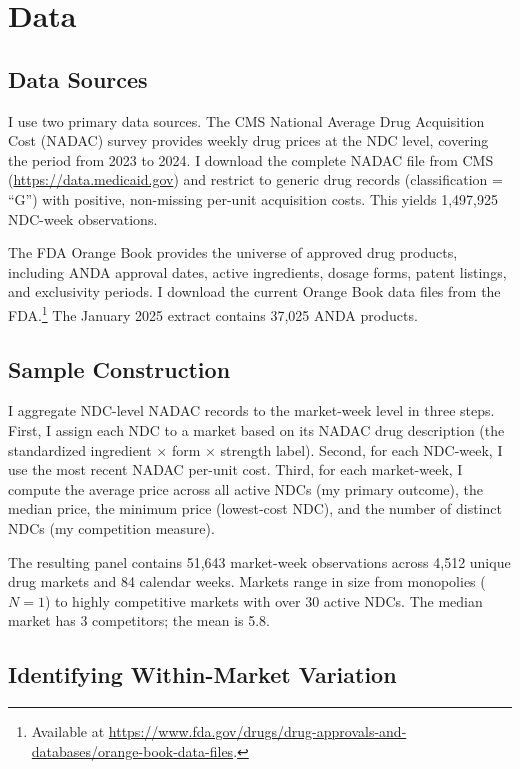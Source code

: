 \documentclass[12pt]{article}
\begin{document}
\section{Data}\label{sec:data}

\subsection{Data Sources}

I use two primary data sources. The CMS National Average Drug Acquisition Cost (NADAC) survey provides weekly drug prices at the NDC level, covering the period from 2023 to 2024. I download the complete NADAC file from CMS (\url{https://data.medicaid.gov}) and restrict to generic drug records (classification = ``G'') with positive, non-missing per-unit acquisition costs. This yields 1,497,925 NDC-week observations.

The FDA Orange Book provides the universe of approved drug products, including ANDA approval dates, active ingredients, dosage forms, patent listings, and exclusivity periods. I download the current Orange Book data files from the FDA.\footnote{Available at \url{https://www.fda.gov/drugs/drug-approvals-and-databases/orange-book-data-files}.} The January 2025 extract contains 37,025 ANDA products.

\subsection{Sample Construction}

I aggregate NDC-level NADAC records to the market-week level in three steps. First, I assign each NDC to a market based on its NADAC drug description (the standardized ingredient $\times$ form $\times$ strength label). Second, for each NDC-week, I use the most recent NADAC per-unit cost. Third, for each market-week, I compute the average price across all active NDCs (my primary outcome), the median price, the minimum price (lowest-cost NDC), and the number of distinct NDCs (my competition measure).

The resulting panel contains 51,643 market-week observations across 4,512 unique drug markets and 84 calendar weeks. Markets range in size from monopolies ($N = 1$) to highly competitive markets with over 30 active NDCs. The median market has 3 competitors; the mean is 5.8.

\subsection{Identifying Within-Market Variation}
\end{document}
